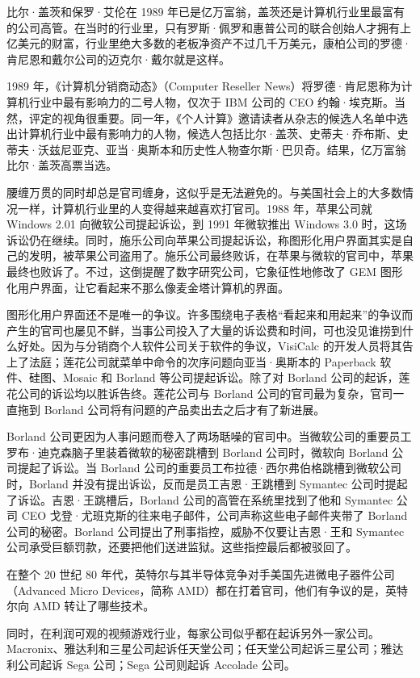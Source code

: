 \documentclass[12pt,UTF8]{ctexbook}
\begin{document}
比尔·盖茨和保罗·艾伦在 1989 年已是亿万富翁，盖茨还是计算机行业里最富有的公司高管。在当时的行业里，只有罗斯·佩罗和惠普公司的联合创始人才拥有上亿美元的财富，行业里绝大多数的老板净资产不过几千万美元，康柏公司的罗德·肯尼恩和戴尔公司的迈克尔·戴尔就是这样。

1989 年，《计算机分销商动态》（Computer Reseller News）将罗德·肯尼恩称为计算机行业中最有影响力的二号人物，仅次于 IBM 公司的 CEO 约翰·埃克斯。当然，评定的视角很重要。同一年，《个人计算》邀请读者从杂志的候选人名单中选出计算机行业中最有影响力的人物，候选人包括比尔·盖茨、史蒂夫·乔布斯、史蒂夫·沃兹尼亚克、亚当·奥斯本和历史性人物查尔斯·巴贝奇。结果，亿万富翁比尔·盖茨高票当选。

腰缠万贯的同时却总是官司缠身，这似乎是无法避免的。与美国社会上的大多数情况一样，计算机行业里的人变得越来越喜欢打官司。1988 年，苹果公司就 Windows 2.01 向微软公司提起诉讼，到 1991 年微软推出 Windows 3.0 时，这场诉讼仍在继续。同时，施乐公司向苹果公司提起诉讼，称图形化用户界面其实是自己的发明，被苹果公司盗用了。施乐公司最终败诉，在苹果与微软的官司中，苹果最终也败诉了。不过，这倒提醒了数字研究公司，它象征性地修改了 GEM 图形化用户界面，让它看起来不那么像麦金塔计算机的界面。

图形化用户界面还不是唯一的争议。许多围绕电子表格“看起来和用起来”的争议而产生的官司也屡见不鲜，当事公司投入了大量的诉讼费和时间，可也没见谁捞到什么好处。因为与分销商个人软件公司关于软件的争议，VisiCalc 的开发人员将其告上了法庭；莲花公司就菜单中命令的次序问题向亚当·奥斯本的 Paperback 软件、硅图、Mosaic 和 Borland 等公司提起诉讼。除了对 Borland 公司的起诉，莲花公司的诉讼均以胜诉告终。莲花公司与 Borland 公司的官司最为复杂，官司一直拖到 Borland 公司将有问题的产品卖出去之后才有了新进展。

Borland 公司更因为人事问题而卷入了两场聒噪的官司中。当微软公司的重要员工罗布·迪克森脑子里装着微软的秘密跳槽到 Borland 公司时，微软向 Borland 公司提起了诉讼。当 Borland 公司的重要员工布拉德·西尔弗伯格跳槽到微软公司时，Borland 并没有提出诉讼，反而是员工吉恩·王跳槽到 Symantec 公司时提起了诉讼。吉恩·王跳槽后，Borland 公司的高管在系统里找到了他和 Symantec 公司 CEO 戈登·尤班克斯的往来电子邮件，公司声称这些电子邮件夹带了 Borland 公司的秘密。Borland 公司提出了刑事指控，威胁不仅要让吉恩·王和 Symantec 公司承受巨额罚款，还要把他们送进监狱。这些指控最后都被驳回了。

在整个 20 世纪 80 年代，英特尔与其半导体竞争对手美国先进微电子器件公司（Advanced Micro Devices，简称 AMD）都在打着官司，他们有争议的是，英特尔向 AMD 转让了哪些技术。

同时，在利润可观的视频游戏行业，每家公司似乎都在起诉另外一家公司。Macronix、雅达利和三星公司起诉任天堂公司；任天堂公司起诉三星公司；雅达利公司起诉 Sega 公司；Sega 公司则起诉 Accolade 公司。
\end{document}
